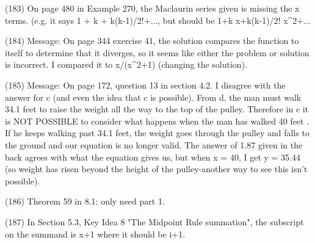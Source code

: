 {(183)  On page 480 in Example 270, the Maclaurin series given is missing the x terms. (e.g. it says 1 + k + k(k-1)/2!+..., but should be 1+k x+k(k-1)/2! x^2+...

(184)  Message: On page 344 exercise 41, the solution compares the function to itself to determine that it diverges, so it seems like either the problem or solution is incorrect. I compared it to x/(x^2+1) (changing the solution).

(185)  Message: On page 172, question 13 in section 4.2. I disagree with the answer for c (and even the idea that c is possible). From d, the man must walk 34.1 feet to raise the weight all the way to the top of the pulley. Therefore in c it is NOT POSSIBLE to consider what happens when the man has walked 40 feet . If he keeps walking past 34.1 feet, the weight goes through the pulley and falls to the ground and our equation is no longer valid. The answer of 1.87 given in the back agrees with what the equation gives us, but when x = 40, I get y = 35.44 (so weight has risen beyond the height of the pulley-another way to see this isn't possible).

(186)  Theorem 59 in 8.1: only need part 1.
%


(187)  In Section 5.3, Key Idea 8 "The Midpoint Rule summation", the subscript on the summand is {x+1} where it should be {i+1}.

}
